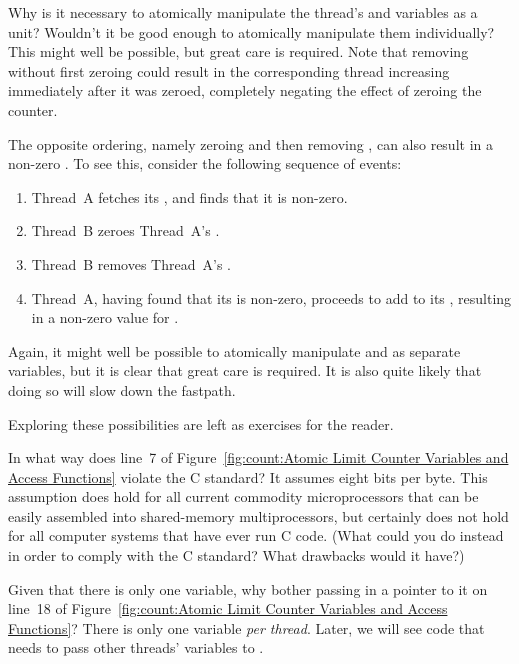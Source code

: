 \QuickQ{}
	Why is it necessary to atomically manipulate the thread's
	 and  variables as a unit?
	Wouldn't it be good enough to atomically manipulate them
	individually?
\QuickA{}
	This might well be possible, but great care is required.
	Note that removing  without first zeroing
	 could result in the corresponding thread
	increasing  immediately after it was zeroed,
	completely negating the effect of zeroing the counter.

	The opposite ordering, namely zeroing  and then
	removing , can also result in a non-zero
	.
	To see this, consider the following sequence of events:

	\begin{enumerate}
	\item	Thread~A fetches its , and finds that
		it is non-zero.
	\item	Thread~B zeroes Thread~A's .
	\item	Thread~B removes Thread~A's .
	\item	Thread~A, having found that its 
		is non-zero, proceeds to add to its ,
		resulting in a non-zero value for .
	\end{enumerate}

	Again, it might well be possible to atomically manipulate
	 and  as separate variables,
	but it is clear that great care is required.
	It is also quite likely that doing so will slow down the
	fastpath.

	Exploring these possibilities are left as exercises for
	the reader.

\QuickQ{}
	In what way does line~7 of
	Figure~\ref{fig:count:Atomic Limit Counter Variables and Access Functions}
	violate the C standard?
\QuickA{}
	It assumes eight bits per byte.
	This assumption does hold for all current commodity microprocessors
	that can be easily assembled into shared-memory multiprocessors,
	but certainly does not hold for all computer systems that have
	ever run C code.
	(What could you do instead in order to comply with the C
	standard?  What drawbacks would it have?)

\QuickQ{}
	Given that there is only one  variable,
	why bother passing in a pointer to it on line~18 of
	Figure~\ref{fig:count:Atomic Limit Counter Variables and Access Functions}?
\QuickA{}
	There is only one  variable \emph{per thread}.
	Later, we will see code that needs to pass other threads'
	 variables to .

